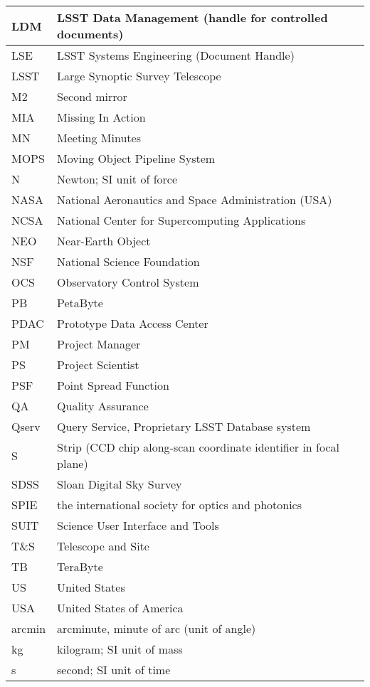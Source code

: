 \begin{longtable}{|l|p{}|}
LDM & LSST Data Management (handle for controlled documents) \\\hline
LSE & LSST Systems Engineering (Document Handle) \\\hline
LSST & Large Synoptic Survey Telescope \\\hline
M2 & Second mirror \\\hline
MIA & Missing In Action \\\hline
MN & Meeting Minutes \\\hline
MOPS & Moving Object Pipeline System \\\hline
N & Newton; SI unit of force \\\hline
NASA & National Aeronautics and Space Administration (USA) \\\hline
NCSA & National Center for Supercomputing Applications \\\hline
NEO & Near-Earth Object \\\hline
NSF & National Science Foundation \\\hline
OCS & Observatory Control System \\\hline
PB & PetaByte \\\hline
PDAC & Prototype Data Access Center \\\hline
PM & Project Manager \\\hline
PS & Project Scientist \\\hline
PSF & Point Spread Function \\\hline
QA & Quality Assurance \\\hline
Qserv & Query Service, Proprietary LSST Database system \\\hline
S & Strip (CCD chip along-scan coordinate identifier in focal plane) \\\hline
SDSS & Sloan Digital Sky Survey \\\hline
SPIE & the international society for optics and photonics \\\hline
SUIT & Science User Interface and Tools \\\hline
T\&S & Telescope and Site \\\hline
TB & TeraByte \\\hline
US & United States \\\hline
USA & United States of America \\\hline
arcmin & arcminute, minute of arc (unit of angle) \\\hline
kg & kilogram; SI unit of mass \\\hline
s & second; SI unit of time \\\hline
\end{longtable}
